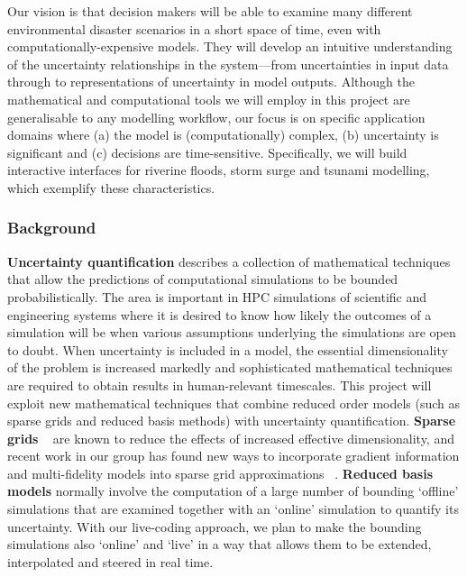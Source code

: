 Our vision is that decision makers will be able
to examine many different environmental disaster scenarios in a short
space of time, even with computationally-expensive models. They will 
develop an intuitive understanding of the uncertainty
relationships in the system---from uncertainties in input data through
to representations of uncertainty in model outputs. 
Although the mathematical and computational tools we will employ in
this project are generalisable to any modelling workflow, our focus is
on specific application domains where (a) the model is
(computationally) complex, (b) uncertainty is significant and (c)
decisions are time-sensitive. Specifically, we will build interactive
interfaces for riverine floods, storm surge and tsunami modelling,
which exemplify these characteristics.
\fi


\subsubsection*{Background}

{\bf Uncertainty quantification} describes a collection of
mathematical techniques that allow the predictions of computational
simulations to be bounded probabilistically. The area is important in
HPC simulations of scientific and
engineering systems where it is desired to know how likely the
outcomes of a simulation will be when various assumptions underlying
the simulations are open to doubt. When uncertainty is included in a
model, the essential dimensionality of the problem is increased
markedly and sophisticated mathematical techniques are required
to obtain results in human-relevant timescales.
This project will exploit new mathematical techniques that
combine {reduced order models} (such as {sparse grids and reduced
basis methods}) with uncertainty quantification. {\bf Sparse grids}
~\parencite{BungartzGriebel2004} are known to reduce the effects of
increased effective dimensionality,
and recent work in our group has found new
ways to incorporate gradient information and multi-fidelity models
into sparse grid approximations
~\parencite{deBaarHarding2015,Jakeman2015,deBaarRDM2015}.  {\bf Reduced
basis models} normally involve the computation of a large number of bounding
`offline' simulations that are examined together with an `online'
simulation to quantify its uncertainty. With our live-coding approach,
we plan to make the bounding simulations 
also  `online' and `live' in a way that allows them to be extended, 
interpolated and steered in real time.



